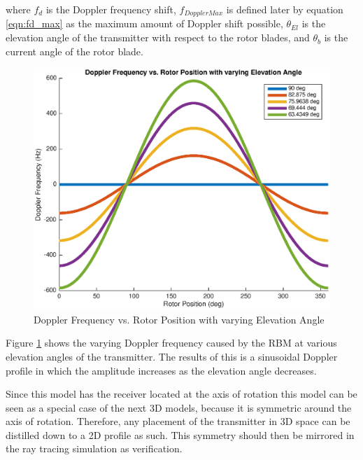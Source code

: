where $f_d$ is the Doppler frequency shift, $f_{DopplerMax}$ is defined later by equation \ref{eqn:fd_max} as the maximum amount of Doppler shift possible, $\theta_{El}$ is the elevation angle of the transmitter with respect to the rotor blades, and $\theta_{b}$ is the current angle of the rotor blade.

\begin{figure}
	\begin{center}
		\includegraphics[width=15cm]{images/background/2d_theoretical_doppler_profile.eps}
		\caption{Doppler Frequency vs. Rotor Position with varying Elevation Angle}
		\label{fig:2D_theoretical_doppler}
	\end{center}
\end{figure}

Figure \ref{fig:2D_theoretical_doppler} shows the varying Doppler frequency caused by the RBM at various elevation angles of the transmitter. The results of this is a sinusoidal Doppler profile in which the amplitude increases as the elevation angle decreases. 

Since this model has the receiver located at the axis of rotation this model can be seen as a special case of the next 3D models, because it is symmetric around the axis of rotation. Therefore, any placement of the transmitter in 3D space can be distilled down to a 2D profile as such. This symmetry should then be mirrored in the ray tracing simulation as verification.

